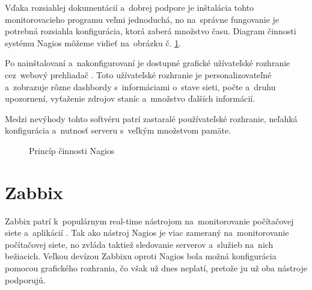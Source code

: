 Vďaka rozsiahlej dokumentácií a~dobrej podpore je inštalácia tohto monitorovacieho programu veľmi jednoduchá, no na~správne fungovanie je potrebná rozsiahla konfigurácia, ktorá zaberá množstvo času. Diagram činnosti systému Nagios môžeme vidieť na~obrázku č. \ref{nagios_scheme}.

Po nainštalovaní a~nakonfigurovaní je dostupné grafické užívateľské rozhranie cez~webový prehliadač \cite{nagios-web}. Toto užívateľské rozhranie je personalizovateľné a~zobrazuje rôzne dashbordy s~informáciami o~stave sieti, počte a~druhu upozornení, vyťaženie zdrojov staníc a~množstvo ďalších informácií.

Medzi nevýhody tohto softvéru patrí zastaralé používateľské rozhranie, neľahká konfigurácia a~nutnosť serveru s~veľkým množstvom pamäte.

\begin{figure}[H]
	\begin{center}
		\caption[caption without footnote, for lof]{Princíp činnosti Nagios\footnotemark}
		\label{nagios_scheme}
	\end{center}
\end{figure}
\section{Zabbix}
Zabbix patrí k~populárnym real-time nástrojom na~monitorovanie počítačovej siete a~ap\-li\-ká\-cií \cite{zabbix-doc}. Tak ako nástroj Nagios je viac zameraný na~monitorovanie počítačovej siete, no zvláda taktiež sledovanie serverov a~služieb na~nich bežiacich. Veľkou devízou Zabbixu oproti Nagios bola možná konfigurácia pomocou grafického rozhrania, čo však už dnes neplatí, pretože ju už oba nástroje podporujú.

